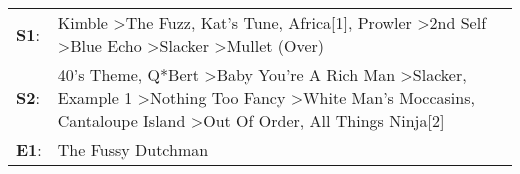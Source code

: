 \begin{supertabular}{p{0.03\textwidth}p{0.92\textwidth}}
 \textbf{S1}:  &                                                                                              Kimble\textsuperscript{} \textgreater \enspace The Fuzz\textsuperscript{}, \enspace Kat's Tune\textsuperscript{}, \enspace Africa[1]\textsuperscript{}, \enspace Prowler\textsuperscript{} \textgreater \enspace 2nd Self\textsuperscript{} \textgreater \enspace Blue Echo\textsuperscript{} \textgreater \enspace Slacker\textsuperscript{} \textgreater \enspace Mullet (Over)\textsuperscript{}  \enspace  \\
 \textbf{S2}:  &  40's Theme\textsuperscript{}, \enspace Q*Bert\textsuperscript{} \textgreater \enspace Baby You're A Rich Man\textsuperscript{} \textgreater \enspace Slacker\textsuperscript{}, \enspace Example 1\textsuperscript{} \textgreater \enspace Nothing Too Fancy\textsuperscript{} \textgreater \enspace White Man's Moccasins\textsuperscript{}, \enspace Cantaloupe Island\textsuperscript{} \textgreater \enspace Out Of Order\textsuperscript{}, \enspace All Things Ninja[2]\textsuperscript{}  \enspace  \\
 \textbf{E1}:  &                                                                                                                                                                                                                                                                                                                                                                                                                                                             The Fussy Dutchman\textsuperscript{}  \enspace  \\
\end{supertabular}
